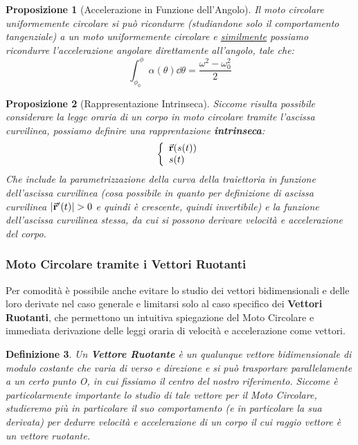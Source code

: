 \documentclass{article}
\newtheorem{defn}{Definizione}[section]
\newtheorem{prop}[defn]{Proposizione}
\renewcommand{\r}{\va{r}}
\begin{document}
\begin{prop}[Accelerazione in Funzione dell'Angolo]
Il moto circolare uniformemente circolare si può ricondurre (studiandone solo il comportamento tangenziale) a un moto uniformemente circolare e \hyperlink{accelerazioneinascissa}{similmente} possiamo ricondurre l'accelerazione angolare direttamente all'angolo, tale che:
\[\int_{\phi_0}^\phi \alpha(\theta)\dd \theta=\frac{\omega^2-\omega_0^2}{2}\]
\end{prop}

\begin{prop}[Rappresentazione Intrinseca]
Siccome risulta possibile considerare la legge oraria di un corpo in moto circolare tramite l'ascissa curvilinea, possiamo definire una rapprentazione \textbf{intrinseca}:
\[\left\{\begin{array}{l}
    \r(s(t))  \\
    s(t)  \\
\end{array}\right.\]
Che include la parametrizzazione della curva della traiettoria in funzione dell'ascissa curvilinea (cosa possibile in quanto per definizione di ascissa curvilinea $|\r'(t)|>0$ e quindi è crescente, quindi invertibile) e la funzione dell'ascissa curvilinea stessa, da cui si possono derivare velocità e accelerazione del corpo.
\end{prop}

\subsubsection{Moto Circolare tramite i Vettori Ruotanti}
Per comodità è possibile anche evitare lo studio  dei vettori bidimensionali e delle loro derivate nel caso generale e limitarsi solo al caso specifico dei \textbf{Vettori Ruotanti}, che permettono un intuitiva spiegazione del Moto Circolare e immediata derivazione delle leggi oraria di velocità e accelerazione come vettori.

\begin{defn}
Un \textbf{Vettore Ruotante} è un qualunque vettore bidimensionale di modulo costante che varia di verso e direzione e si può trasportare parallelamente a un certo punto O, in cui fissiamo il centro del nostro riferimento. Siccome è particolarmente importante lo studio di tale vettore per il Moto Circolare, studieremo più in particolare il suo comportamento (e in particolare la sua derivata) per dedurre velocità e accelerazione di un corpo il cui raggio vettore è un vettore ruotante.
\end{defn}
\end{document}
